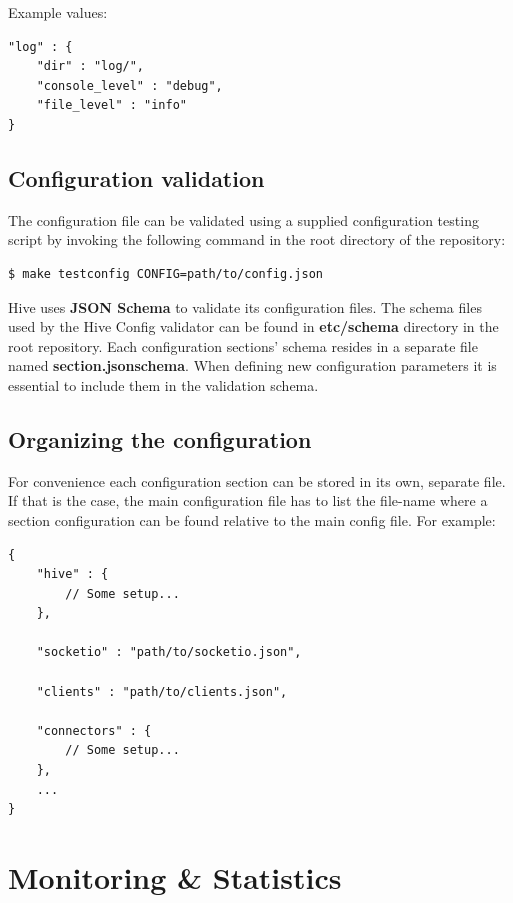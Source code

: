 \documentclass[a4paper]{article}
\begin{document}
\noindent
Example values:


\begin{verbatim}
"log" : {
    "dir" : "log/",
    "console_level" : "debug",
    "file_level" : "info"
}
\end{verbatim}
\subsection{Configuration validation}
\label{sec-3-2}

The configuration file can be validated using a supplied configuration testing script by invoking the following command in the root directory of the repository:


\begin{verbatim}
$ make testconfig CONFIG=path/to/config.json
\end{verbatim}



\noindent
Hive uses \textbf{JSON Schema} to validate its configuration files. The schema files used by the Hive Config validator can be found in \textbf{etc/schema} directory in the root repository. Each configuration sections' schema resides in a separate file named \textbf{section.jsonschema}. When defining new configuration parameters it is essential to include them in the validation schema.
\subsection{Organizing the configuration}
\label{sec-3-3}

For convenience each configuration section can be stored in its own, separate file. If that is the case, the main configuration file has to list the file-name where a section configuration can be found relative to the main config file. For example:


\begin{verbatim}
{
    "hive" : {
        // Some setup...
    },

    "socketio" : "path/to/socketio.json",

    "clients" : "path/to/clients.json",

    "connectors" : {
        // Some setup...
    },
    ...
}
\end{verbatim}




\pagebreak
\section{Monitoring \& Statistics}
\label{sec-4}
\end{document}
